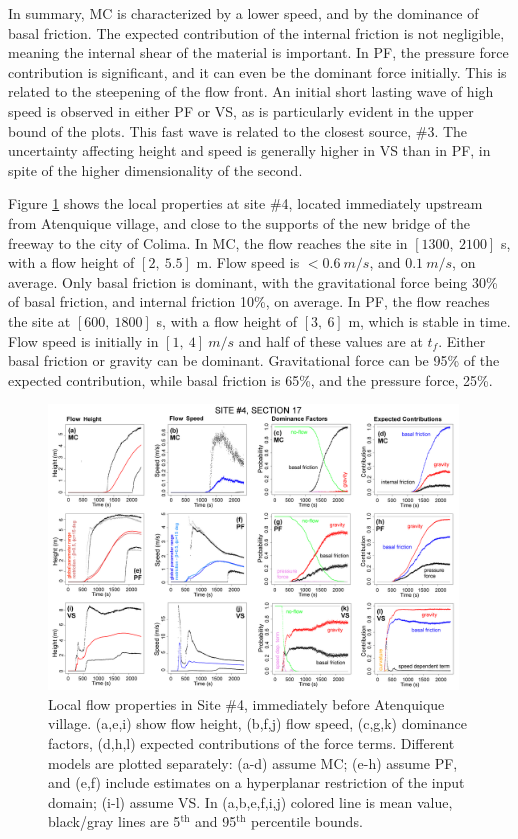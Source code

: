 \documentclass[nhess, manuscript]{copernicus}
\begin{document}
In summary, MC is characterized by a lower speed, and by the dominance of basal friction. The expected contribution of the internal friction is not negligible, meaning the internal shear of the material is important. In PF, the pressure force contribution is significant, and it can even be the dominant force initially. This is related to the steepening of the flow front. An initial short lasting wave of high speed is observed in either PF or VS, as is particularly evident in the upper bound of the plots. This fast wave is related to the closest source, \#3. The uncertainty affecting height and speed is generally higher in VS than in PF, in spite of the higher dimensionality of the second.

Figure \ref{Fig6} shows the local properties at site \#4, located immediately upstream from Atenquique village, and close to the supports of the new bridge of the freeway to the city of Colima. In MC, the flow reaches the site in $[1300,\ 2100]$ s, with a flow height of $[2,\ 5.5]$ m. Flow speed is $<0.6\ m/s$, and $0.1\ m/s$, on average. Only basal friction is dominant, with the gravitational force being 30\% of basal friction, and internal friction 10\%, on average. In PF, the flow reaches the site at $[600,\ 1800]$ s, with a flow height of $[3,\ 6]$ m, which is stable in time. Flow speed is initially in $[1,\ 4]\ m/s$ and half of these values are at $t_f$. Either basal friction or gravity can be dominant. Gravitational force can be 95\% of the expected contribution, while basal friction is 65\%, and the pressure force, 25\%. 
\begin{figure}[H]
\centering
\includegraphics[width=0.97\textwidth]{Fig6.png}
\caption{Local flow properties in Site \#4, immediately before Atenquique village. (a,e,i) show flow height, (b,f,j) flow speed, (c,g,k) dominance factors, (d,h,l) expected contributions of the force terms. Different models are plotted separately: (a-d) assume MC; (e-h) assume PF, and (e,f) include estimates on a hyperplanar restriction of the input domain; (i-l) assume VS. In (a,b,e,f,i,j) colored line is mean value, black/gray lines are 5$^{\mathrm{th}}$ and 95$^{\mathrm{th}}$ percentile bounds.}
\label{Fig6}
\end{figure}
\end{document}
